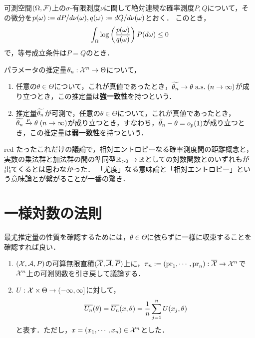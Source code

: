 \documentclass[uplatex,dvipdfmx]{jsreport}
\begin{document}
\begin{lemma}
    可測空間$(\Omega,\mathcal{F})$上の$\sigma$-有限測度$\nu$に関して絶対連続な確率測度$P,Q$について，その微分を$p(\omega):=dP/d\nu(\omega),q(\omega):=dQ/d\nu(\omega)$とおく．
    このとき，
    \[\int_\Omega\log\left(\frac{p(\omega)}{q(\omega)}\right)P(d\omega)\le 0\]
    で，等号成立条件は$P=Q$のとき．
\end{lemma}

\begin{definition}[consistency]
    パラメータの推定量$\theta_n:\mathcal{X}^n\to\Theta$について，
    \begin{enumerate}
        \item 任意の$\theta\in\Theta$について，これが真値であったとき，$\widetilde{\theta_n}\to\theta\;\mathrm{a.s.}\;(n\to\infty)$が成り立つとき，この推定量は\textbf{強一致性}を持つという．
        \item 推定量$\widetilde{\theta_n}$が可測で，任意の$\theta\in\Theta$について，これが真値であったとき，$\widetilde{\theta_n}\xrightarrow{p}\theta\;(n\to\infty)$が成り立つとき，すなわち，$\widetilde{\theta}_n-\theta=o_p(1)$が成り立つとき，この推定量は\textbf{弱一致性}を持つという．
    \end{enumerate}
\end{definition}

\begin{tbox}{red}{}
    たったこれだけの議論で，相対エントロピーなる確率測度間の距離概念と，実数の乗法群と加法群の間の準同型$\mathbb{R}_{>0}\to\mathbb{R}$としての対数関数とのいずれもが出てくるとは思わなかった．
    「尤度」なる意味論と「相対エントロピー」という意味論とが繋がることが一番の驚き．
\end{tbox}

\section{一様対数の法則}

\begin{tcolorbox}[colframe=ForestGreen, colback=ForestGreen!10!white,breakable,colbacktitle=ForestGreen!40!white,coltitle=black,fonttitle=\bfseries\sffamily,
title=]
    最尤推定量の性質を確認するためには，$\theta\in\Theta$に依らずに一様に収束することを確認すれば良い．
\end{tcolorbox}

\begin{notation}\mbox{}
    \begin{enumerate}
        \item $(\mathcal{X},\mathcal{A},P)$の可算無限直積$(\overline{\mathcal{X}},\overline{\mathcal{A}},\overline{P})$上に，$\pi_n:=(\mathrm{pr}_1,\cdots,\mathrm{pr}_n):\overline{\mathcal{X}}\to\mathcal{X}^n$で$\mathcal{X}^n$上の可測関数を引き戻して議論する．
        \item $U:\mathcal{X}\times\Theta\to(-\infty,\infty]$に対して，
        \[\overline{U_n}(\theta)=\overline{U_n}(x,\theta)=\frac{1}{n}\sum^n_{j=1}U(x_j,\theta)\]
        と表す．ただし，$x=(x_1,\cdots,x_n)\in\mathcal{X}^n$とした．
    \end{enumerate}
\end{notation}
\end{document}
